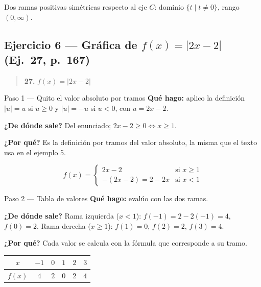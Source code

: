 \documentclass[11pt]{article}
\begin{document}
\begin{resp}
Dos ramas positivas simétricas respecto al eje $C$: dominio $\{t\mid t\ne 0\}$, rango $(0,\infty)$.
\end{resp}

\subsection*{Ejercicio 6 — Gráfica de $f(x)=|2x-2|$ (Ej.~27, p.~167)}

\begin{quote}
\textbf{27.} $f(x)=|2x-2|$
\end{quote}

\begin{paso}{Paso 1 --- Quito el valor absoluto por tramos}
\textbf{Qué hago:} aplico la definición $|u|=u$ si $u\ge0$ y $|u|=-u$ si $u<0$, con $u=2x-2$.

\textbf{¿De dónde sale?} Del enunciado; $2x-2\ge 0 \Leftrightarrow x\ge 1$.

\textbf{¿Por qué?} Es la definición por tramos del valor absoluto, la misma que el texto usa en el ejemplo 5.

\[
f(x)=\begin{cases}2x-2 & \text{si } x\ge 1\\ -(2x-2)=2-2x & \text{si } x<1\end{cases}
\]
\end{paso}

\begin{paso}{Paso 2 --- Tabla de valores}
\textbf{Qué hago:} evalúo con las dos ramas.

\textbf{¿De dónde sale?} Rama izquierda ($x<1$): $f(-1)=2-2(-1)=4$, $f(0)=2$. Rama derecha ($x\ge1$): $f(1)=0$, $f(2)=2$, $f(3)=4$.

\textbf{¿Por qué?} Cada valor se calcula con la fórmula que corresponde a su tramo.

\begin{center}
\begin{tabular}{|c|c|c|c|c|c|}
\hline
$x$ & $-1$ & $0$ & $1$ & $2$ & $3$\\\hline
$f(x)$ & $4$ & $2$ & $0$ & $2$ & $4$\\\hline
\end{tabular}
\end{center}
\end{paso}
\end{document}
